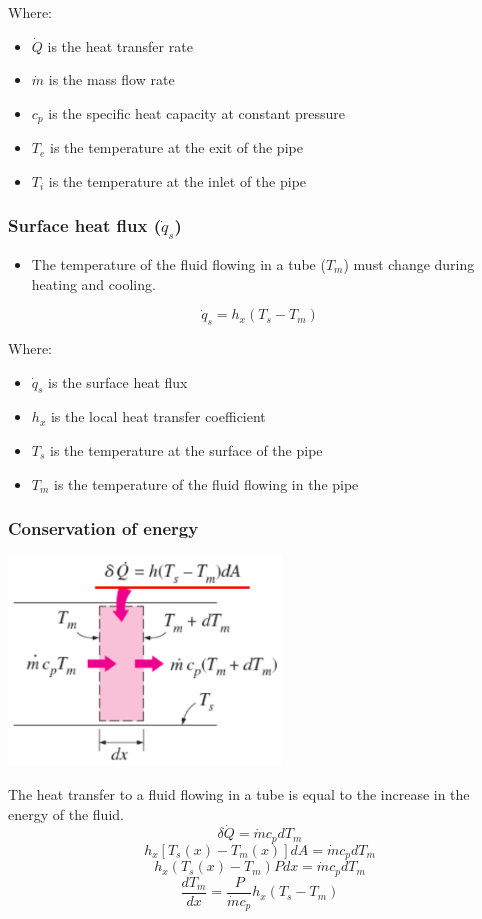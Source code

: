 \documentclass[11pt]{article}
\begin{document}
Where:
\begin{itemize}
\item \(\dot{Q}\) is the heat transfer rate
\item \(\dot{m}\) is the mass flow rate
\item \(c_p\) is the specific heat capacity at constant pressure
\item \(T_e\) is the temperature at the exit of the pipe
\item \(T_i\) is the temperature at the inlet of the pipe
\end{itemize}

\subsubsection{Surface heat flux (\(\dot{q}_s\))}
\label{sec:org4fe2802}
\begin{itemize}
\item The temperature of the fluid flowing in a tube (\(T_m\)) must change during heating and cooling.
\end{itemize}
\[\dot{q}_s = h_x (T_s - T_m)\]

Where:
\begin{itemize}
\item \(\dot{q}_s\) is the surface heat flux
\item \(h_x\) is the local heat transfer coefficient
\item \(T_s\) is the temperature at the surface of the pipe
\item \(T_m\) is the temperature of the fluid flowing in the pipe
\end{itemize}

\subsubsection{Conservation of energy}
\label{sec:orgbb388ac}
\begin{center}
\includegraphics[height=15em]{./images/general-thermal-analysis-conservation-of-energy.png}
\end{center}
The heat transfer to a fluid flowing in a tube is equal to the increase in the energy of the fluid.
\[\delta \dot{Q} = \dot{m} c_p dT_m\]
\[h_x [T_s (x) - T_m (x)] dA = \dot{m} c_p dT_m\]
\[h_x (T_s (x) - T_m) P dx = \dot{m} c_p dT_m\]
\[\frac{dT_m}{dx} = \frac{P}{\dot{m} c_p} h_x (T_s - T_m)\]
\end{document}
